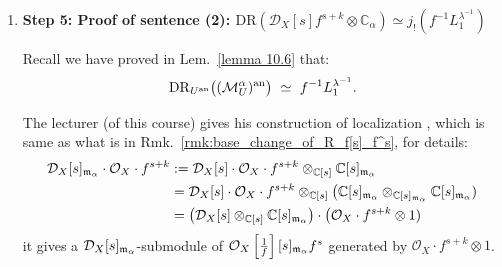 \begin{remark}
\begin{enumerate}
              Finally, since $\sigma$ is proper, de Rham commutes with proper pushforward
              \cite[Proposition~4.7.5]{hotta2008d}:
              \[
                  \mathrm{DR}_{(X)^\mathrm{an}}((\sigma_+M'^\alpha)^\mathrm{an})\simeq R\sigma_*\,\mathrm{DR}_{(X')^\mathrm{an}}((M'^\alpha)^\mathrm{an}).
              \]
              Using $j=\sigma\circ j'$ and $Rj_*\simeq R\sigma_*Rj'_*$, we obtain
              \[
                  \mathrm{DR}_{(X)^\mathrm{an}}((\sigma_+M'^\alpha)^\mathrm{an})\simeq Rj_*(f^{-1}L_1^{\lambda^{-1}}).
              \]
              Since $\sigma$ is an isomorphism over $U$.
              We have $M'^\alpha = \mathcal O_{X'}(*D')\cdot (f')^\alpha \simeq j'_+(\mathcal O_{U}\cdot f^\alpha)$.

              So we have
              \[
                  \sigma_+ M'^\alpha \simeq \sigma_+ (j'_+(\mathcal O_{U}\cdot f^\alpha)) = j_+ (\mathcal O_U\cdot f^\alpha) = M^\alpha.
              \]
              Substituting this into the previous equation, we finally get
              \[
                  \mathrm{DR}_{X^\mathrm{an}}\big((M^\alpha)^\mathrm{an}\big)\simeq Rj_*(f^{-1}L_1^{\lambda^{-1}}).
              \]

        \item \textbf{Step 5: Proof of sentence (2): $\mathrm{DR}(\mathcal D_X[s]f^{s+k}\otimes \mathbb C_\alpha)\simeq j_!(f^{-1}L_1^{\lambda^{-1}})$}

              Recall we have proved in Lem.~\ref{lemma 10.6} that:
              \[
                  \mathrm{DR}_{U^\mathrm{an}}\bigl((\mathcal M_U^\alpha)^{\mathrm{an}}\bigr)\ \simeq\ f^{-1}L_1^{\lambda^{-1}}.
              \]

              The lecturer (of this course) gives his construction of localization \cite[Definition~2.4]{Wu2020ComparisonNearbyCyclesBfunctions},
              which is same as what is in Rmk.~\ref{rmk:base_change_of_R_f[s]_f^s}, for details:
              \begin{align*}
                  \mathcal D_X[s]_{\mathfrak{m}_\alpha}\cdot \mathcal O_X\cdot f^{s+k} & := \mathcal D_X[s] \cdot \mathcal O_X\cdot f^{s+k} \otimes_{\mathbb{C}[s]} \mathbb{C}[s]_{\mathfrak{m}_\alpha}                                                                       \\
                                                                                       & =\mathcal D_X[s] \cdot \mathcal O_X\cdot f^{s+k} \otimes_{\mathbb{C}[s]} \big(\mathbb{C}[s]_{\mathfrak{m}_\alpha} \otimes_{\mathbb{C}[s]_{\mathfrak{m}_\alpha}} \mathbb{C}[s]_{\mathfrak{m}_\alpha}) \\
                                                                                       & = \big(\mathcal D_X[s] \otimes_{\mathbb{C}[s]} \mathbb{C}[s]_{\mathfrak{m}_\alpha}\big) \cdot \big(\mathcal O_X\cdot f^{s+k} \otimes 1)
              \end{align*}
              it gives a $\mathcal{D}_X[s]_{\mathfrak{m}_\alpha}$-submodule of $\mathcal{O}_X\left[\frac{1}{f}\right][s]_{\mathfrak{m}_\alpha}f^s$ generated by $\mathcal O_X\cdot f^{s+k} \otimes 1$.


\end{enumerate}
\end{remark}
